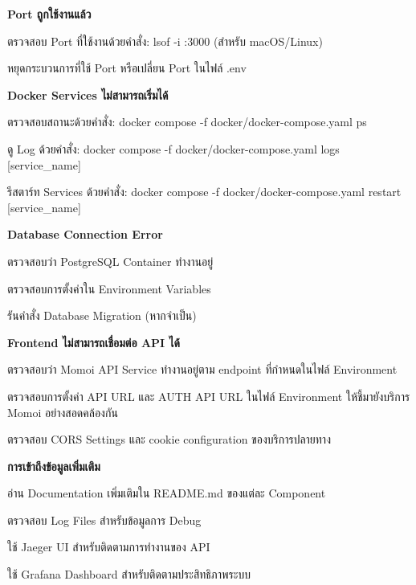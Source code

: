 \begin{mycustomenum2}
    \item \textbf{Port ถูกใช้งานแล้ว}
    \begin{mycustomenum2}
        \item ตรวจสอบ Port ที่ใช้งานด้วยคำสั่ง: lsof -i :3000 (สำหรับ macOS/Linux)
        \item หยุดกระบวนการที่ใช้ Port หรือเปลี่ยน Port ในไฟล์ .env
    \end{mycustomenum2}

    \item \textbf{Docker Services ไม่สามารถเริ่มได้}
    \begin{mycustomenum2}
        \item ตรวจสอบสถานะด้วยคำสั่ง: docker compose -f docker/docker-compose.yaml ps
        \item ดู Log ด้วยคำสั่ง: docker compose -f docker/docker-compose.yaml logs [service\_name]
        \item รีสตาร์ท Services ด้วยคำสั่ง: docker compose -f docker/docker-compose.yaml restart [service\_name]
    \end{mycustomenum2}

    \item \textbf{Database Connection Error}
    \begin{mycustomenum2}
        \item ตรวจสอบว่า PostgreSQL Container ทำงานอยู่
        \item ตรวจสอบการตั้งค่าใน Environment Variables
        \item รันคำสั่ง Database Migration (หากจำเป็น)
    \end{mycustomenum2}

    \item \textbf{Frontend ไม่สามารถเชื่อมต่อ API ได้}
    \begin{mycustomenum2}
        \item ตรวจสอบว่า Momoi API Service ทำงานอยู่ตาม endpoint ที่กำหนดในไฟล์ Environment
        \item ตรวจสอบการตั้งค่า API URL และ AUTH API URL ในไฟล์ Environment ให้ชี้มายังบริการ Momoi อย่างสอดคล้องกัน
        \item ตรวจสอบ CORS Settings และ cookie configuration ของบริการปลายทาง
    \end{mycustomenum2}
\end{mycustomenum2}

\vspace{0.5em}
\textbf{การเข้าถึงข้อมูลเพิ่มเติม}
\vspace{0.5em}

\begin{mycustomenum2}
    \item อ่าน Documentation เพิ่มเติมใน README.md ของแต่ละ Component
    \item ตรวจสอบ Log Files สำหรับข้อมูลการ Debug
    \item ใช้ Jaeger UI สำหรับติดตามการทำงานของ API
    \item ใช้ Grafana Dashboard สำหรับติดตามประสิทธิภาพระบบ
\end{mycustomenum2}
